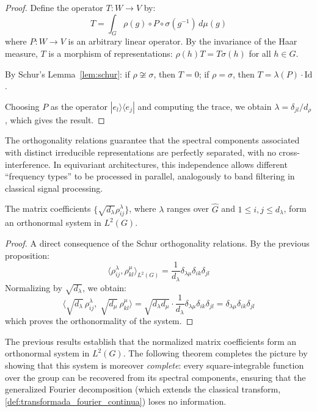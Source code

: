 \begin{proof}
Define the operator $T: W \to V$ by:
\[
T = \int_G \rho(g) \circ P \circ \sigma(g^{-1}) \, d\mu(g)
\]
where $P: W \to V$ is an arbitrary linear operator. By the invariance of the Haar measure, $T$ is a morphism of representations: $\rho(h) T = T \sigma(h)$ for all $h \in G$.

By Schur's Lemma~\ref{lem:schur}: if $\rho \not\cong \sigma$, then $T = 0$; if $\rho = \sigma$, then $T = \lambda(P) \cdot \mathrm{Id}$.

Choosing $P$ as the operator $|e_l\rangle\langle e_j|$ and computing the trace, we obtain $\lambda = \delta_{jl}/d_\rho$, which gives the result.
\end{proof}

The orthogonality relations guarantee that the spectral components associated with distinct irreducible representations are perfectly separated, with no cross-interference. In equivariant architectures, this independence allows different ``frequency types'' to be processed in parallel, analogously to band filtering in classical signal processing.

\begin{corollary}\label{cor:base_ortonormal_coeficientes}
The matrix coefficients $\{\sqrt{d_\lambda} \rho^\lambda_{ij}\}$, where $\lambda$ ranges over $\widehat{G}$ and $1 \leq i,j \leq d_\lambda$, form an orthonormal system in $L^2(G)$.
\end{corollary}

\begin{proof}
A direct consequence of the Schur orthogonality relations. By the previous proposition:
\[
\langle \rho^\lambda_{ij}, \rho^\mu_{kl} \rangle_{L^2(G)} = \frac{1}{d_\lambda} \delta_{\lambda\mu} \delta_{ik} \delta_{jl}
\]
Normalizing by $\sqrt{d_\lambda}$, we obtain:
\[
\langle \sqrt{d_\lambda}\, \rho^\lambda_{ij},\; \sqrt{d_\mu}\, \rho^\mu_{kl} \rangle = \sqrt{d_\lambda d_\mu} \cdot \frac{1}{d_\lambda} \delta_{\lambda\mu} \delta_{ik} \delta_{jl} = \delta_{\lambda\mu} \delta_{ik} \delta_{jl}
\]
which proves the orthonormality of the system.
\end{proof}

The previous results establish that the normalized matrix coefficients form an orthonormal system in $L^2(G)$. The following theorem completes the picture by showing that this system is moreover \textit{complete}: every square-integrable function over the group can be recovered from its spectral components, ensuring that the generalized Fourier decomposition (which extends the classical transform, \autoref{def:transformada_fourier_continua}) loses no information.

